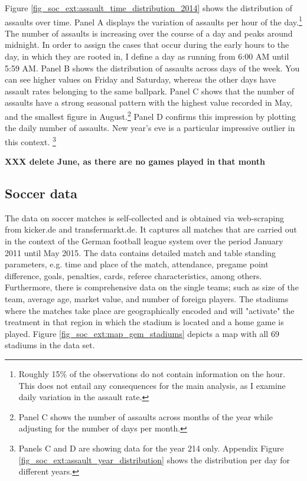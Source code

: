 \documentclass[11pt, a4paper]{article} %
\begin{document}
Figure \ref{fig_soc_ext:assault_time_distribution_2014} shows the distribution of assaults over time. Panel A displays the variation of assaults per hour of the day.\footnote{Roughly 15\% of the observations do not contain information on the hour. This does not entail any consequences for the main analysis, as I examine daily variation in the assault rate.} The number of assaults is increasing over the course of a day and peaks around midnight. In order to assign the cases that occur during the early hours to the day, in which they are rooted in, I define a day as running from 6:00 AM until 5:59 AM. Panel B shows the distribution of assaults across days of the week. You can see higher values on Friday and Saturday, whereas the other days have assault rates belonging to the same ballpark. Panel C shows that the number of assaults have a strong seasonal pattern with the highest value recorded in May, and the smallest figure in August.\footnote{Panel C shows the number of assaults across months of the year while adjusting for the number of days per month.} Panel D confirms this impression by plotting the daily number of assaults. New year's eve is a particular impressive outlier in this context. \footnote{Panels C and D are showing data for the year 214 only. Appendix Figure  \ref{fig_soc_ext:assault_year_distribution} shows the distribution per day for different years.}

\textbf{XXX delete June, as there are no games played in that month}



\subsection{Soccer data}
The data on soccer matches is self-collected and is obtained via web-scraping from kicker.de and transfermarkt.de. It captures all matches that are carried out in the context of the German football league system over the period January 2011 until May 2015. The data contains detailed match and table standing parameters, e.g. time and place of the match, attendance, pregame point difference, goals, penalties, cards, referee characteristics, among others. Furthermore, there is comprehensive data on the single teams; such as size of the team, average age, market value, and number of foreign players. The stadiums where the matches take place are geographically encoded and will "activate" the treatment in that region in which the stadium is located and a home game is played. Figure \ref{fig_soc_ext:map_gem_stadiums} depicts a map with all 69 stadiums in the data set. 
\end{document}
